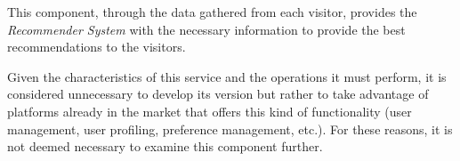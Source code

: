 This component, through the data gathered from each visitor, provides the \textit{Recommender System} with the necessary information to provide the best recommendations to the visitors.

Given the characteristics of this service and the operations it must perform, it is considered unnecessary to develop its version but rather to
take advantage of platforms already in the market that offers this kind of functionality (user management, user profiling, preference management,
etc.). For these reasons, it is not deemed necessary to examine this component further.

